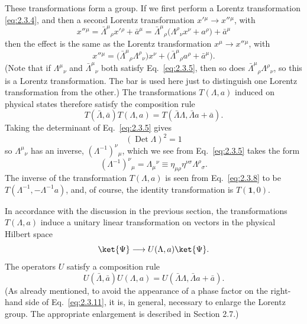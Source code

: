 These transformations form a group. If we first perform a Lorentz
transformation \eqref{eq:2.3.4}, and then a second Lorentz transformation
$x'{}^\mu\to x''{}^\mu$, with
\begin{equation*}
  x''{}^\mu=\bar\Lambda^\mu{}_{\rho}x'{}^\rho+\bar a^\mu
  =\bar\Lambda^\mu{}_{\rho}
    \bigl(\Lambda^\rho{}_{\nu}x^\nu+a^\rho\bigr)+\bar a^\mu
\end{equation*}
then the effect is the same as the Lorentz transformation
$x^\mu\to x''{}^\mu$, with
\begin{equation}
  x''{}^\mu
    =\bigl(\bar\Lambda^\mu{}_{\rho}\Lambda^\rho{}_{\nu}\bigr)x^\nu
      +\bigl(\bar\Lambda^\mu{}_{\rho}a^\rho+\bar a^\mu\bigr).
  \tag{2.3.7}\label{eq:2.3.7}
\end{equation}
(Note that if $\Lambda^\mu{}_{\nu}$ and $\bar\Lambda^\mu{}_{\nu}$ both
satisfy Eq.~\eqref{eq:2.3.5}, then so does
$\bar\Lambda^\mu{}_{\rho}\Lambda^\rho{}_{\nu}$, so this is a Lorentz
transformation. The bar is used here just to distinguish one Lorentz
transformation from the other.) The transformations $T(\Lambda,a)$
induced on physical states therefore satisfy the composition rule
\begin{equation}
  T(\bar\Lambda,\bar a)T(\Lambda,a)
    =T(\bar\Lambda\Lambda,\bar\Lambda a+\bar a).
  \tag{2.3.8}\label{eq:2.3.8}
\end{equation}
Taking the determinant of Eq.~\eqref{eq:2.3.5} gives
\begin{equation}
  (\operatorname{Det}\Lambda)^2=1
  \tag{2.3.9}\label{eq:2.3.9}
\end{equation}
so $\Lambda^\mu{}_{\nu}$ has an inverse,
$(\Lambda^{-1})^\nu{}_{\mu}$, which we see from Eq.~\eqref{eq:2.3.5} takes the form
\begin{equation}
  (\Lambda^{-1})^\nu{}_{\mu}
    =\Lambda_{\mu}{}^\nu
    \equiv\eta_{\mu\rho}\eta^{\nu\sigma}\Lambda^\rho{}_{\sigma}.
  \tag{2.3.10}\label{eq:2.3.10}
\end{equation}
The inverse of the transformation $T(\Lambda,a)$ is seen from Eq.~\eqref{eq:2.3.8}
to be $T(\Lambda^{-1},-\Lambda^{-1}a)$, and, of course, the identity
transformation is $T(\mathbf{1},0)$.

In accordance with the discussion in the previous section, the
transformations $T(\Lambda,a)$ induce a unitary linear transformation on
vectors in the physical Hilbert space
\begin{equation*}
  \ket{\Psi}\longrightarrow U(\Lambda,a)\ket{\Psi}.
\end{equation*}
The operators $U$ satisfy a composition rule
\begin{equation}
  U(\bar\Lambda,\bar a)U(\Lambda,a)
    =U(\bar\Lambda\Lambda,\bar\Lambda a+\bar a).
  \tag{2.3.11}\label{eq:2.3.11}
\end{equation}
(As already mentioned, to avoid the appearance of a phase factor on the
right-hand side of Eq.~\eqref{eq:2.3.11}, it is, in general, necessary to enlarge
the Lorentz group. The appropriate enlargement is described in
Section 2.7.)

